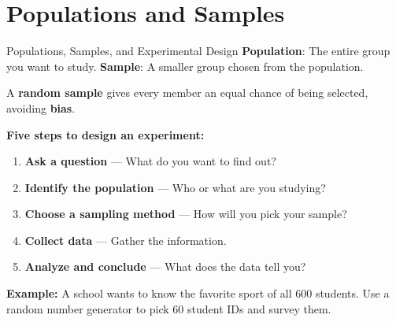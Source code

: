 \section{Populations and Samples}

\begin{quickReview}{Populations, Samples, and Experimental Design}
\textbf{Population}: The entire group you want to study.
\textbf{Sample}: A smaller group chosen from the population.

A \textbf{random sample} gives every member an equal chance of being selected, avoiding \textbf{bias}.

\textbf{Five steps to design an experiment:}
\begin{enumerate}[leftmargin=*]
    \item \textbf{Ask a question} --- What do you want to find out?
    \item \textbf{Identify the population} --- Who or what are you studying?
    \item \textbf{Choose a sampling method} --- How will you pick your sample?
    \item \textbf{Collect data} --- Gather the information.
    \item \textbf{Analyze and conclude} --- What does the data tell you?
\end{enumerate}

\medskip
\textbf{Example:} A school wants to know the favorite sport of all $600$ students. Use a random number generator to pick $60$ student IDs and survey them.
\end{quickReview}

